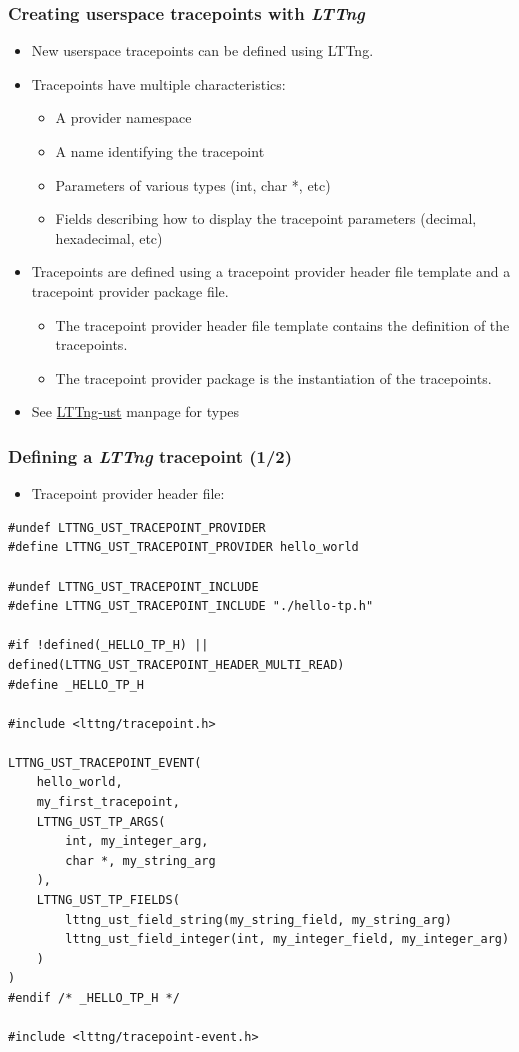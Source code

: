 \begin{frame}
  \frametitle{Creating userspace tracepoints with {\em LTTng}}
  \begin{itemize}
    \item New userspace tracepoints can be defined using LTTng.
    \item Tracepoints have multiple characteristics:
    \begin{itemize}
      \item A provider namespace
      \item A name identifying the tracepoint
      \item Parameters of various types (int, char *, etc)
      \item Fields describing how to display the tracepoint parameters
            (decimal, hexadecimal, etc)
    \end{itemize}
    \item Tracepoints are defined using a tracepoint provider header file
          template and a tracepoint provider package file.
    \begin{itemize}
      \item The tracepoint provider header file template contains the definition
            of the tracepoints.
      \item The tracepoint provider package is the instantiation of the
            tracepoints.
    \end{itemize}
    \item See \href{https://lttng.org/man/3/lttng-ust/v2.13/}{LTTng-ust} manpage
          for types
  \end{itemize}
\end{frame}

\begin{frame}[fragile]
  \frametitle{Defining a {\em LTTng} tracepoint (1/2)}

  \begin{itemize}
    \item Tracepoint provider header file:
  \end{itemize}
  \begin{block}{}
    \begin{verbatim}
#undef LTTNG_UST_TRACEPOINT_PROVIDER
#define LTTNG_UST_TRACEPOINT_PROVIDER hello_world

#undef LTTNG_UST_TRACEPOINT_INCLUDE
#define LTTNG_UST_TRACEPOINT_INCLUDE "./hello-tp.h"

#if !defined(_HELLO_TP_H) || defined(LTTNG_UST_TRACEPOINT_HEADER_MULTI_READ)
#define _HELLO_TP_H

#include <lttng/tracepoint.h>

LTTNG_UST_TRACEPOINT_EVENT(
    hello_world,
    my_first_tracepoint,
    LTTNG_UST_TP_ARGS(
        int, my_integer_arg,
        char *, my_string_arg
    ),
    LTTNG_UST_TP_FIELDS(
        lttng_ust_field_string(my_string_field, my_string_arg)
        lttng_ust_field_integer(int, my_integer_field, my_integer_arg)
    )
)
#endif /* _HELLO_TP_H */

#include <lttng/tracepoint-event.h>
   \end{verbatim}
  \end{block}
\end{frame}

